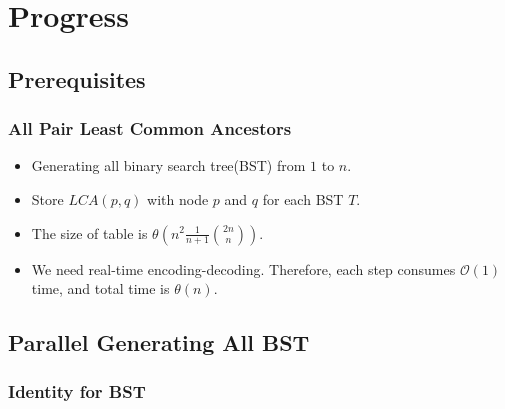 \section{Progress}

\subsection{Prerequisites}
\begin{frame}
    \frametitle{All Pair Least Common Ancestors}
    \begin{itemize}
    	\setlength\itemsep{1em}
    	\item Generating all binary search tree(BST) from $1$ to $n$.
    	\item Store $\textit{LCA}(p, q)$ with node $p$ and $q$ for each BST $T$.
		\item The size of table is $\theta(n^2 \frac{1}{n+1} \binom{2n}{n})$.
		\item We need real-time encoding-decoding. Therefore, 
			each step consumes $\mathcal{O}(1)$ time, 
			and total time is $\mathcal{\theta}(n)$.
    \end{itemize}
\end{frame}

\subsection{Parallel Generating All BST}
\begin{frame}
	\frametitle{Identity for BST}
		
		
		
\end{frame}